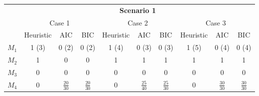 \documentclass[AMS,STIX1COL]{WileyNJD-v2}
\begin{document}
{\begin{enumerate}
    \begin{table}[htbp]
    \centering
    \begin{tabular}{c|ccc|ccc|ccc}
                & \multicolumn{9}{c}{\textbf{Scenario 1}}                                              \\
                \cline{2-10}
                & \multicolumn{3}{c|}{Case 1} & \multicolumn{3}{c|}{Case 2} & \multicolumn{3}{c}{Case 3} \\
                \cline{2-10}
                & Heuristic   & AIC   & BIC  & Heuristic   & AIC   & BIC  & Heuristic   & AIC   & BIC  \\
                \hline
    $M_{1}$   &    1 (3)  &    0 (2)   &  0 (2)  &    1 (4)    &  0 (3)   &  0 (3)  &    1 (5)  &   0 (4)    & 0 (4) \\
    $M_{2}$   &    1     &    0 &      0 &         1    &     1  &    1  &         1    &    1   &   1   \\
    $M_{3}$   &    0     &    0 &      0 &         0    &     0  &    0  &         0    &    0   &   0   \\
    $M_{4}$   &  0  &   $\frac{20}{30}$    &  $\frac{20}{30}$    &   0          &   $\frac{25}{40}$    &   $\frac{25}{30}$   &  0      &  $\frac{30}{30}$     &   $\frac{30}{30}$   \\
                \hline
    \end{tabular}


\end{table}
\end{enumerate}}
\end{document}
